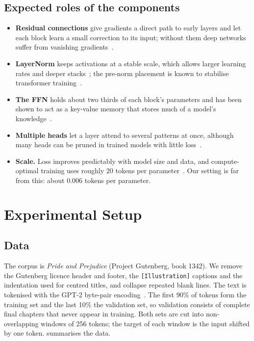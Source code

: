 \documentclass[11pt,a4paper]{article}
\begin{document}
\subsection{Expected roles of the components}
\begin{itemize}[leftmargin=*]
  \item \textbf{Residual connections} give gradients a direct path to early layers and let each block learn a small correction to its input; without them deep networks suffer from vanishing gradients~\cite{he2016resnet}.
  \item \textbf{LayerNorm} keeps activations at a stable scale, which allows larger learning rates and deeper stacks~\cite{ba2016layernorm}; the pre-norm placement is known to stabilise transformer training~\cite{xiong2020prenorm}.
  \item \textbf{The FFN} holds about two thirds of each block's parameters and has been shown to act as a key-value memory that stores much of a model's knowledge~\cite{geva2021ffn}.
  \item \textbf{Multiple heads} let a layer attend to several patterns at once, although many heads can be pruned in trained models with little loss~\cite{michel2019sixteen}.
  \item \textbf{Scale.} Loss improves predictably with model size and data, and compute-optimal training uses roughly 20 tokens per parameter~\cite{kaplan2020scaling,hoffmann2022chinchilla}. Our setting is far from this: about $0.006$ tokens per parameter.
\end{itemize}

\section{Experimental Setup}\label{sec:setup}

\subsection{Data}
The corpus is \emph{Pride and Prejudice} (Project Gutenberg, book 1342). We remove the Gutenberg licence header and footer, the \texttt{[Illustration]} captions and the indentation used for centred titles, and collapse repeated blank lines. The text is tokenised with the GPT-2 byte-pair encoding~\cite{sennrich2016bpe,radford2019gpt2}. The first 90\% of tokens form the training set and the last 10\% the validation set, so validation consists of complete final chapters that never appear in training. Both sets are cut into non-overlapping windows of 256 tokens; the target of each window is the input shifted by one token.  summarises the data.
\end{document}
